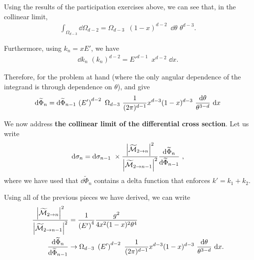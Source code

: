 Using the results of the participation exercises above, we can see that, in the collinear limit,
\begin{align}
    \int_{\Omega_{d-3}} \dd \Omega_{d-2}
    =
    \Omega_{d-3}
    \,\,\,
    (1-x)^{d-2}
    \,\,\,
    \dd \theta
    \,\,
    \theta^{d-3}
    .
\end{align}

Furthermore, using \(k_n = x E'\), we have
\begin{align}
    \dd k_n \,\, (k_n)^{d-2}
    =
    E'^{d-1}
    \,\,\,
    x^{d-2}
    \,\,
    \dd x
    .
\end{align}

Therefore, for the problem at hand (where the only angular dependence of the integrand is through dependence on \(\theta\)),  and  give
\begin{align}
    \dd \widetilde\Phi_n
    =
    \dd\widetilde\Phi_{n-1}
    \,
    \left(E'\right)^{d-2}
    \,\,
    \Omega_{d-3}
    \,\,
    \frac{1}{(2\pi)^{d-1}}
    x^{d-3}
    (1-x)^{d-3}
    \,\,
    \frac{\dd \theta}{\theta^{3-d}}
    \,\,
    \dd x
\end{align}

We now address \textbf{the collinear limit of the differential cross section}.
%
Let us write
\begin{align}
    \dd \sigma_n
    =
    \dd\sigma_{n-1}
    \,\,
    \times
    \frac{\left|\widetilde{\mathcal{M}}_{2\to n}\right|^2}
    {\left|\widetilde{\mathcal{M}}_{2\to {n-1}}\right|^2}
    \frac{\dd\widetilde{\Phi}_n}{\dd \widetilde\Phi_{n-1}}
    \
    ,
\end{align}
where we have used that \(\dd \widetilde\Phi_n\) contains a delta function that enforces \(k' = k_1 + k_2\).


Using all of the previous pieces we have derived, we can write
\begin{align}
    \frac{\left|\widetilde{\mathcal{M}}_{2\to n}\right|^2}
    {\left|\widetilde{\mathcal{M}}_{2\to {n-1}}\right|^2}
    &=
    \frac{1}{\left(E'\right)^4}
    \frac{g^2}{4 x^2 (1-x)^2 \theta^4}
    \\
    \frac{\dd\widetilde{\Phi}_n}{\dd \widetilde\Phi_{n-1}}
    &\to
    \Omega_{d-3}
    \,\,
    \left(E'\right)^{d-2}
    \,\,
    \frac{1}{(2\pi)^{d-1}}
    x^{d-3}
    (1-x)^{d-3}
    \,\,
    \frac{\dd \theta}{\theta^{3-d}}
    \,\,
    \dd x
    .
\end{align}


